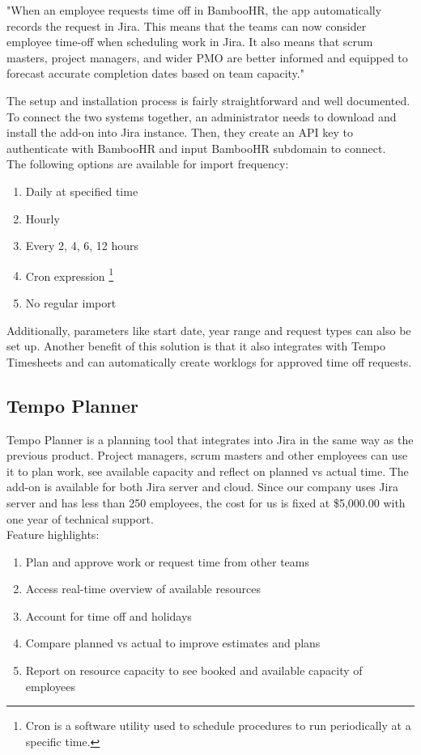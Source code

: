 \documentclass[12pt,oneside]{fithesis2}
\begin{document}
"When an employee requests time off in BambooHR, the app automatically records the request in Jira. This means that the teams can now consider employee time-off when scheduling work in Jira. It also means that scrum masters, project managers, and wider PMO are better informed and equipped to forecast accurate completion dates based on team capacity."\cite{bamboohr-jira-integration}

The setup and installation process is fairly straightforward and well documented. To connect the two systems together, an administrator needs to download and install the add-on into Jira instance. Then, they create an API key to authenticate with BambooHR and input BambooHR subdomain to connect.\\

\noindent The following options are available for import frequency:
\begin{enumerate}[itemsep=0mm]
    \item Daily at specified time
    \item Hourly
    \item Every 2, 4, 6, 12 hours
    \item Cron expression \footnote{Cron is a software utility used to schedule procedures to run periodically at a specific time.}
    \item No regular import
\end{enumerate}

Additionally, parameters like start date, year range and request types can also be set up. Another benefit of this solution is that it also integrates with Tempo Timesheets and can automatically create worklogs for approved time off requests.

\subsection*{Tempo Planner}
Tempo Planner is a planning tool that integrates into Jira in the same way as the previous product. Project managers, scrum masters and other employees can use it to plan work, see available capacity and reflect on planned vs actual time. The add-on is available for both Jira server and cloud. Since our company uses Jira server and has less than 250 employees, the cost for us is fixed at \$5,000.00 with one year of technical support.\\

\noindent Feature highlights:
\begin{enumerate}[itemsep=0mm]
    \item Plan and approve work or request time from other teams
    \item Access real-time overview of available resources
    \item Account for time off and holidays
    \item Compare planned vs actual to improve estimates and plans
    \item Report on resource capacity to see booked and available capacity of employees
\end{enumerate}
\end{document}
